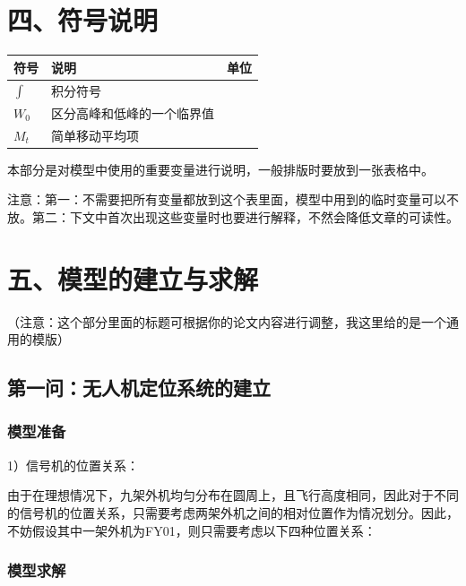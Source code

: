 \documentclass{my_paper}
\begin{document}
\section{四、符号说明}
\begin{table}[h]%
    \centering
    \begin{tabular}{p{2.0cm}<{\centering}p{9.0cm}<{\centering}p{2.0cm}<{\centering}}
    \hline
    符号 & 说明 & 单位 \\ %
    \hline
    $\int$ & 积分符号 &  \\ %
    $W_0$ & 区分高峰和低峰的一个临界值 &  \\ %
    $M_t$ &  简单移动平均项 &  \\ %
    \hline
    \end{tabular}
\end{table}
本部分是对模型中使用的重要变量进行说明，一般排版时要放到一张表格中。

注意：第一：不需要把所有变量都放到这个表里面，模型中用到的临时变量可以不放。第二：下文中首次出现这些变量时也要进行解释，不然会降低文章的可读性。

\section{五、模型的建立与求解}

（注意：这个部分里面的标题可根据你的论文内容进行调整，我这里给的是一个通用的模版）

\subsection{第一问：无人机定位系统的建立}
\subsubsection{模型准备}
1）信号机的位置关系：

由于在理想情况下，九架外机均匀分布在圆周上，且飞行高度相同，因此对于不同的信号机的位置关系，只需要考虑两架外机之间的相对位置作为情况划分。因此，不妨假设其中一架外机为FY01，则只需要考虑以下四种位置关系：


\subsubsection{模型求解}
\end{document}
